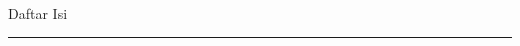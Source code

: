 \thispagestyle{plain}
\\[0.3em]
{\bricolagesb\fontsize{20pt}{24pt}\selectfont\color{cink} Daftar Isi}
\vspace{0.3em}
\noindent\textcolor{cline}{\rule{\linewidth}{0.8pt}}
\vspace{0.6em}

\renewcommand{\contentsname}{}
\begin{footnotesize}
\end{footnotesize}
{\fontsize{10.5pt}{18pt}\selectfont
\tableofcontents
}
\clearpage
